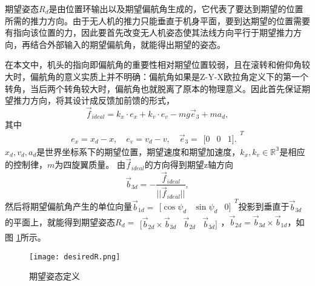     期望姿态$R_d$是由位置环输出以及期望偏航角生成的，它代表了要达到期望的位置所需的推力方向。由于无人机的推力只能垂直于机身平面，要到达期望的位置需要有指向该位置的力，因此要首先改变无人机姿态使其法线方向平行于期望推力方向，再结合外部输入的期望偏航角，就能得出期望的姿态\cite{Lee2010}。

    在本文中，机头的指向即偏航角的重要性相对期望位置较弱，且在滚转和俯仰角较大时，偏航角的意义实质上并不明确：偏航角如果是Z-Y-X欧拉角定义下的第一个转角，当后两个转角较大时，偏航角也就脱离了原本的物理意义。因此首先保证期望推力方向，将其设计成反馈加前馈的形式，
    $$\vec f_{ideal}=k_x \cdot e_x+k_v \cdot e_v-mg \vec e_3+m a_d,$$
其中
    $$ e_x=x_d-x ,\quad e_v=v_d-v ,\quad \vec e_3=\begin{matrix}
        [0 & 0 & 1].
    \end{matrix}^T$$
  $x_d,v_d,a_d$是世界坐标系下的期望位置，期望速度和期望加速度，$k_x,k_v \in \mathbb{R^3}$是相应的控制律，$m$为四旋翼质量。
  由$\vec f_{ideal}$的方向得到期望z轴方向
  $$\vec b_{3d}=-\frac{\vec f_{ideal}}{||\vec f_{ideal}||},$$
  然后将期望偏航角产生的单位向量$\vec b_{1d}=\begin{matrix} [\cos{\psi_d} & \sin{\psi_d} & 0]  \end{matrix}^T$投影到垂直于$\vec b_{3d}$的平面上，就能得到期望姿态$R_d= \begin{matrix} [ \vec b_{2d}\times \vec b_{3d} &\vec b_{2d} & \vec b_{3d}] \end{matrix}$，$\vec b_{2d}=\vec b_{3d} \times \vec b_{1d}$，如图 \ref{fig:2}所示。
    \begin{figure}[!h]
        \centering
        \texttt{[image: desiredR.png]}
        \caption{期望姿态定义}
        \label{fig:2}
      \end{figure}

